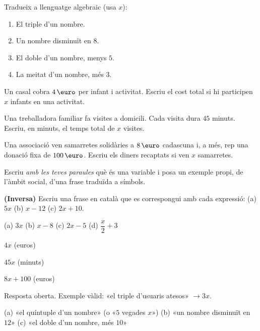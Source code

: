 \begin{exercicis}
\begin{exlist}
  \item Tradueix a llenguatge algebraic (usa $x$):
    \begin{enumerate}[label=\alph*), leftmargin=1.6em, topsep=2pt]
      \item El triple d'un nombre.
      \item Un nombre disminuït en $8$.
      \item El doble d'un nombre, menys $5$.
      \item La meitat d'un nombre, més $3$.
    \end{enumerate}
  \item Un casal cobra $4\eur$ per infant i activitat. Escriu el cost total
        si hi participen $x$ infants en una activitat.
  \item Una treballadora familiar fa visites a domicili. Cada visita dura
        $45$ minuts. Escriu, en minuts, el temps total de $x$ visites.
  \item Una associació ven samarretes solidàries a $8\eur$ cadascuna i, a més,
        rep una donació fixa de $100\eur$. Escriu els diners recaptats si ven
        $x$ samarretes.
  \item Escriu \emph{amb les teves paraules} què és una variable i posa un
        exemple propi, de l'àmbit social, d'una frase traduïda a símbols.
  \item \textbf{(Inversa)} Escriu una frase en català que es correspongui amb
        cada expressió: \quad (a) $5x$ \quad (b) $x-12$ \quad (c) $2x+10$.
\end{exlist}
\end{exercicis}

\begin{solucions}
\begin{sollist}
  \item (a) $3x$ \quad (b) $x-8$ \quad (c) $2x-5$ \quad (d) $\dfrac{x}{2}+3$
  \item $4x$ (euros)
  \item $45x$ (minuts)
  \item $8x+100$ (euros)
  \item Resposta oberta. Exemple vàlid: «el triple d'usuaris atesos» $\rightarrow 3x$.
  \item (a) «el quíntuple d'un nombre» (o «$5$ vegades $x$») \quad
        (b) «un nombre disminuït en $12$» \quad
        (c) «el doble d'un nombre, més $10$»
\end{sollist}
\end{solucions}
